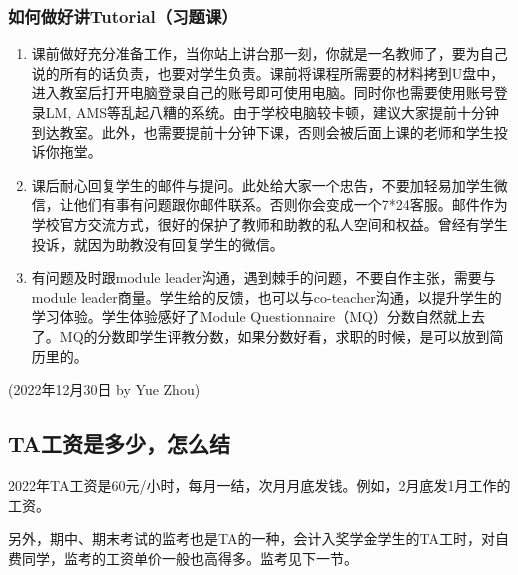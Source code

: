 \subsubsection{如何做好讲Tutorial（习题课）}

\begin{enumerate}
    \item 课前做好充分准备工作，当你站上讲台那一刻，你就是一名教师了，要为自己说的所有的话负责，也要对学生负责。课前将课程所需要的材料拷到U盘中，进入教室后打开电脑登录自己的账号即可使用电脑。同时你也需要使用账号登录LM, AMS等乱起八糟的系统。由于学校电脑较卡顿，建议大家提前十分钟到达教室。此外，也需要提前十分钟下课，否则会被后面上课的老师和学生投诉你拖堂。
    \item 课后耐心回复学生的邮件与提问。此处给大家一个忠告，不要加轻易加学生微信，让他们有事有问题跟你邮件联系。否则你会变成一个7*24客服。邮件作为学校官方交流方式，很好的保护了教师和助教的私人空间和权益。曾经有学生投诉，就因为助教没有回复学生的微信。
    \item 有问题及时跟module leader沟通，遇到棘手的问题，不要自作主张，需要与module leader商量。学生给的反馈，也可以与co-teacher沟通，以提升学生的学习体验。学生体验感好了Module Questionnaire（MQ）分数自然就上去了。MQ的分数即学生评教分数，如果分数好看，求职的时候，是可以放到简历里的。
\end{enumerate}

\begin{flushright}
    (2022年12月30日 by Yue Zhou)
\end{flushright}

\subsection{TA工资是多少，怎么结}
2022年TA工资是60元/小时，每月一结，次月月底发钱。例如，2月底发1月工作的工资。

\emptyline{}
另外，期中、期末考试的监考也是TA的一种，会计入奖学金学生的TA工时，对自费同学，监考的工资单价一般也高得多。监考见下一节。
